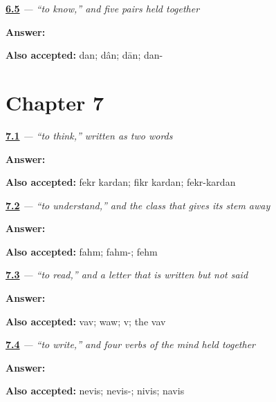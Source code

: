 \noindent\begin{minipage}[t]{\linewidth}
\raggedright
\hyperlink{review-FA-C06-danestan-pair}{\textbf{6.5}} \emph{ — “to know,” and five pairs held together}\par
\small \textbf{Answer:} \par
\footnotesize \textbf{Also accepted:} dan; dân; dān; dan-
\end{minipage}\par\medskip

\section*{Chapter 7}

\noindent\begin{minipage}[t]{\linewidth}
\raggedright
\hyperlink{review-FA-C07-fekr-kardan-verb}{\textbf{7.1}} \emph{  — “to think,” written as two words}\par
\small \textbf{Answer:}  \par
\footnotesize \textbf{Also accepted:} fekr kardan; fikr kardan; fekr-kardan
\end{minipage}\par\medskip

\noindent\begin{minipage}[t]{\linewidth}
\raggedright
\hyperlink{review-FA-C07-fahmidan-stem}{\textbf{7.2}} \emph{ — “to understand,” and the class that gives its stem away}\par
\small \textbf{Answer:} \par
\footnotesize \textbf{Also accepted:} fahm; fahm-; fehm
\end{minipage}\par\medskip

\noindent\begin{minipage}[t]{\linewidth}
\raggedright
\hyperlink{review-FA-C07-khandan-silent-vav}{\textbf{7.3}} \emph{ — “to read,” and a letter that is written but not said}\par
\small \textbf{Answer:} \par
\footnotesize \textbf{Also accepted:} vav; waw; v; the vav
\end{minipage}\par\medskip

\noindent\begin{minipage}[t]{\linewidth}
\raggedright
\hyperlink{review-FA-C07-neveshtan-stem}{\textbf{7.4}} \emph{ — “to write,” and four verbs of the mind held together}\par
\small \textbf{Answer:} \par
\footnotesize \textbf{Also accepted:} nevis; nevis-; nivis; navis
\end{minipage}\par\medskip

